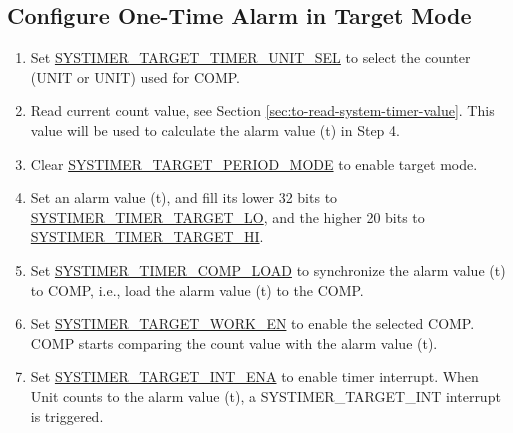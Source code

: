 \documentclass[main\_\_EN.tex]{subfiles}
\begin{document}
\subsection{Configure One-Time Alarm in Target Mode}
\begin{enumerate}
    \item Set \hyperref[fielddesc:SYSTIMERTARGET0TIMERUNITSEL]{SYSTIMER\_TARGET\_TIMER\_UNIT\_SEL} to select the counter (UNIT or UNIT) used for COMP.
    \item Read current count value, see Section \ref{sec:to-read-system-timer-value}. This value will be used to calculate the alarm value (t) in Step 4.
    \item Clear \hyperref[fielddesc:SYSTIMERTARGET0PERIODMODE]{SYSTIMER\_TARGET\_PERIOD\_MODE} to enable target mode.
    \item Set an alarm value (t), and fill its lower 32 bits to \hyperref[fielddesc:SYSTIMERTIMERTARGET0LO]{SYSTIMER\_TIMER\_TARGET\_LO}, and the higher 20 bits to \hyperref[fielddesc:SYSTIMERTIMERTARGET0HI]{SYSTIMER\_TIMER\_TARGET\_HI}.
    \item Set \hyperref[fielddesc:SYSTIMERTIMERCOMP0LOAD]{SYSTIMER\_TIMER\_COMP\_LOAD} to synchronize the alarm value (t) to COMP, i.e., load the alarm value (t) to the COMP.
    \item Set \hyperref[fielddesc:SYSTIMERTARGET0WORKEN]{SYSTIMER\_TARGET\_WORK\_EN} to enable the selected COMP. COMP starts comparing the count value with the alarm value (t).
    \item Set \hyperref[fielddesc:SYSTIMERTARGET0INTENA]{SYSTIMER\_TARGET\_INT\_ENA} to enable timer interrupt. When Unit counts to the alarm value (t), a SYSTIMER\_TARGET\_INT interrupt is triggered.
\end{enumerate}
\end{document}
